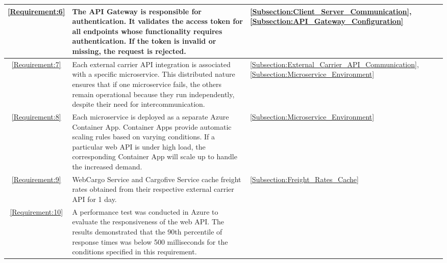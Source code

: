 \documentclass[12pt, reqno]{amsbook}
\theoremstyle{definition}
\theoremstyle{definition}
\numberwithin{section}{chapter}
\numberwithin{table}{chapter}
\numberwithin{figure}{chapter}
\begin{document}
\begin{longtable}{|c|m{280pt}|M{65pt}|}
  \hline
  \ref{Requirement:6}
   & The \ac{API} Gateway is responsible for authentication. It validates the access token for all endpoints whose functionality requires authentication. If the token is invalid or missing, the request is rejected.
   & \ref{Subsection:Client_Server_Communication}, \ref{Subsection:API_Gateway_Configuration}                                                                                                                                                                                                  \\
  \hline
  \ref{Requirement:7}
   & Each external carrier \ac{API} integration is associated with a specific microservice. This distributed nature ensures that if one microservice fails, the others remain operational because they run independently, despite their need for intercommunication.
   & \ref{Subsection:External_Carrier_API_Communication}, \ref{Subsection:Microservice_Environment}                                                                                                                                                                                            \\
  \hline
  \ref{Requirement:8}
   & Each microservice is deployed as a separate Azure Container App. Container Apps provide automatic scaling rules based on varying conditions. If a particular web \ac{API} is under high load, the corresponding Container App will scale up to handle the increased demand.
   & \ref{Subsection:Microservice_Environment}                                                                                                                                                                                                                                                 \\
  \hline
  \ref{Requirement:9}
   & WebCargo Service and Cargofive Service cache freight rates obtained from their respective external carrier \ac{API} for 1 day.
   & \ref{Subsection:Freight_Rates_Cache}                                                                                                                                                                                                                                                      \\
  \hline
  \ref{Requirement:10}
   & A performance test was conducted in Azure to evaluate the responsiveness of the web \ac{API}. The results demonstrated that the 90th percentile of response times was below 500 milliseconds for the conditions specified in this requirement.

\end{longtable}
\end{document}
